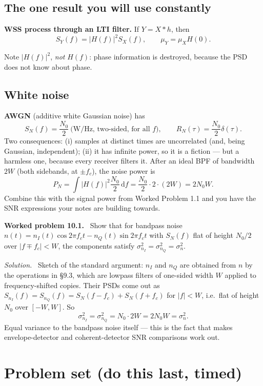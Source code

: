 \documentclass[11pt,a4paper]{article}
\newcommand{\dd}{\,\mathrm{d}}
\newenvironment{worked}[1]{\par\vspace{4pt}\noindent\textbf{\color{warmred}Worked problem #1.}\ \ignorespaces}{\par\vspace{4pt}}
\newcommand{\soln}{\par\vspace{2pt}\noindent\textit{Solution.}\ \ignorespaces}
\begin{document}
\subsection{The one result you will use constantly}
\begin{keybox}
\textbf{WSS process through an LTI filter.} If $Y=X*h$, then
\[
S_Y(f)=|H(f)|^2 S_X(f),\qquad \mu_Y=\mu_X H(0).
\]
\end{keybox}
Note $|H(f)|^2$, \emph{not} $H(f)$: phase information is destroyed, because the PSD does not know about phase.

\subsection{White noise}
\textbf{AWGN} (additive white Gaussian noise) has
\[
S_N(f)=\frac{N_0}{2}\ \text{(W/Hz, two-sided, for all $f$)},\qquad R_N(\tau)=\frac{N_0}{2}\delta(\tau).
\]
Two consequences: (i) samples at distinct times are uncorrelated (and, being Gaussian, independent);
(ii) it has infinite power, so it is a fiction --- but a harmless one, because every receiver filters it.
After an ideal BPF of bandwidth $2W$ (both sidebands, at $\pm f_c$), the noise power is
\[
P_N=\int|H(f)|^2\frac{N_0}{2}\dd f=\frac{N_0}{2}\cdot 2\cdot(2W)=2N_0W .
\]
Combine this with the signal power from Worked Problem 1.1 and you have the SNR expressions your notes are
building towards.

\begin{worked}{10.1}
Show that for bandpass noise $n(t)=n_I(t)\cos2\pi f_ct-n_Q(t)\sin2\pi f_ct$ with $S_N(f)$ flat of height
$N_0/2$ over $|f\mp f_c|<W$, the components satisfy $\sigma_{n_I}^2=\sigma_{n_Q}^2=\sigma_n^2$.
\end{worked}
\soln
Sketch of the standard argument: $n_I$ and $n_Q$ are obtained from $n$ by the operations in \S9.3, which are
lowpass filters of one-sided width $W$ applied to frequency-shifted copies. Their PSDs come out as
$S_{n_I}(f)=S_{n_Q}(f)=S_N(f-f_c)+S_N(f+f_c)$ for $|f|<W$, i.e.\ flat of height $N_0$ over $[-W,W]$. So
\[
\sigma_{n_I}^2=\sigma_{n_Q}^2=N_0\cdot 2W = 2N_0W=\sigma_n^2 .
\]
Equal variance to the bandpass noise itself --- this is the fact that makes envelope-detector and
coherent-detector SNR comparisons work out.

\section{Problem set (do this last, timed)}
\end{document}
